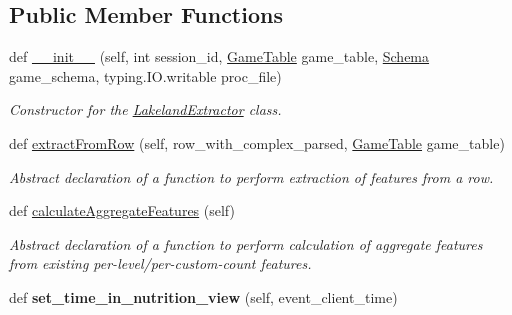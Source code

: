 \subsection*{Public Member Functions}
\begin{DoxyCompactItemize}
\item 
def \mbox{\hyperlink{classfeature__extractors_1_1_lakeland_extractor_1_1_lakeland_extractor_a37d5fb9484dbf1a2c841828f0348cf1e}{\+\_\+\+\_\+init\+\_\+\+\_\+}} (self, int session\+\_\+id, \mbox{\hyperlink{class_game_table_1_1_game_table}{Game\+Table}} game\+\_\+table, \mbox{\hyperlink{classschemas_1_1_schema_1_1_schema}{Schema}} game\+\_\+schema, typing.\+I\+O.\+writable proc\+\_\+file)
\begin{DoxyCompactList}\small\item\em Constructor for the \mbox{\hyperlink{classfeature__extractors_1_1_lakeland_extractor_1_1_lakeland_extractor}{Lakeland\+Extractor}} class. \end{DoxyCompactList}\item 
def \mbox{\hyperlink{classfeature__extractors_1_1_lakeland_extractor_1_1_lakeland_extractor_a1648b69f5bf98cad7a5c67a2c5be90f9}{extract\+From\+Row}} (self, row\+\_\+with\+\_\+complex\+\_\+parsed, \mbox{\hyperlink{class_game_table_1_1_game_table}{Game\+Table}} game\+\_\+table)
\begin{DoxyCompactList}\small\item\em Abstract declaration of a function to perform extraction of features from a row. \end{DoxyCompactList}\item 
def \mbox{\hyperlink{classfeature__extractors_1_1_lakeland_extractor_1_1_lakeland_extractor_a9f6f9e4a7857cb4905f27e5dad7e1404}{calculate\+Aggregate\+Features}} (self)
\begin{DoxyCompactList}\small\item\em Abstract declaration of a function to perform calculation of aggregate features from existing per-\/level/per-\/custom-\/count features. \end{DoxyCompactList}\item 
\mbox{\label{classfeature__extractors_1_1_lakeland_extractor_1_1_lakeland_extractor_a1b700952f8188eef3228623827884640}} 
def {\bfseries set\+\_\+time\+\_\+in\+\_\+nutrition\+\_\+view} (self, event\+\_\+client\+\_\+time)
\item 
\mbox{\label{classfeature__extractors_1_1_lakeland_extractor_1_1_lakeland_extractor_a1f6696969378d6ad50f47e82f5dd981e}} 

\end{DoxyCompactItemize}
